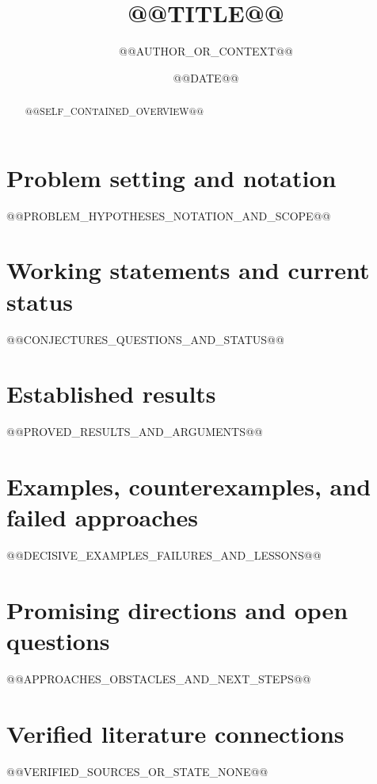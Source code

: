 \documentclass[11pt,a4paper]{article}
\title{@@TITLE@@}
\author{@@AUTHOR_OR_CONTEXT@@}
\date{@@DATE@@}
\theoremstyle{definition}
\theoremstyle{remark}
\begin{document}
\maketitle

\begin{abstract}
@@SELF_CONTAINED_OVERVIEW@@
\end{abstract}

\section{Problem setting and notation}
@@PROBLEM_HYPOTHESES_NOTATION_AND_SCOPE@@

\section{Working statements and current status}
@@CONJECTURES_QUESTIONS_AND_STATUS@@

\section{Established results}
@@PROVED_RESULTS_AND_ARGUMENTS@@

\section{Examples, counterexamples, and failed approaches}
@@DECISIVE_EXAMPLES_FAILURES_AND_LESSONS@@

\section{Promising directions and open questions}
@@APPROACHES_OBSTACLES_AND_NEXT_STEPS@@

\section*{Verified literature connections}
@@VERIFIED_SOURCES_OR_STATE_NONE@@
\end{document}
